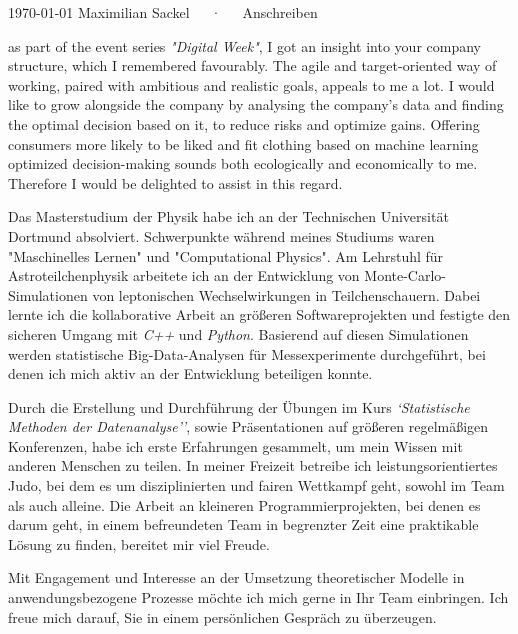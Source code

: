 \documentclass[11pt, a4paper]{Awesome-CV/awesome-cv}
\begin{document}
\makecvheader[R]

\makecvfooter
{\today}
{Maximilian Sackel~~~·~~~Anschreiben}
{}

\makelettertitle

\begin{cvletter}
    as part of the event series \textit{"Digital Week"}, I got an insight into your company structure,
    which I remembered favourably.
    The agile and target-oriented way of working,
    paired with ambitious and realistic goals,
    appeals to me a lot.
    I would like to grow alongside the company by analysing the company's data
    and finding the optimal decision based on it, to reduce risks and optimize gains.
    Offering consumers more likely to be liked and fit clothing based on machine learning optimized decision-making sounds both ecologically and economically to me.
    Therefore I would be delighted to assist in this regard.

    Das Masterstudium der Physik habe ich an der Technischen Universität Dortmund absolviert.  Schwerpunkte während meines Studiums waren "Maschinelles Lernen" und "Computational Physics".
    Am Lehrstuhl für Astroteilchenphysik arbeitete ich an der Entwicklung von Monte-Carlo-Simulationen von leptonischen Wechselwirkungen in Teilchenschauern.
    Dabei lernte ich die kollaborative Arbeit an größeren Softwareprojekten und festigte den sicheren Umgang mit \textit{C++} und \textit{Python}.
    Basierend auf diesen Simulationen werden statistische Big-Data-Analysen für Messexperimente durchgeführt, bei denen ich mich aktiv an der Entwicklung beteiligen konnte.

    Durch die Erstellung und Durchführung der Übungen im Kurs \textit{`Statistische Methoden der Datenanalyse''}, sowie Präsentationen auf größeren regelmäßigen Konferenzen, habe ich erste Erfahrungen gesammelt, um mein Wissen mit anderen Menschen zu teilen.
    In meiner Freizeit betreibe ich leistungsorientiertes Judo, bei dem es um disziplinierten und fairen Wettkampf geht, sowohl im Team als auch alleine.
    Die Arbeit an kleineren Programmierprojekten, bei denen es darum geht, in einem befreundeten Team in begrenzter Zeit eine praktikable Lösung zu finden, bereitet mir viel Freude.

    Mit Engagement und Interesse an der Umsetzung theoretischer Modelle in anwendungsbezogene Prozesse möchte ich mich gerne in Ihr Team einbringen.
    Ich freue mich darauf, Sie in einem persönlichen Gespräch zu überzeugen.

\end{cvletter}


\makeletterclosing
\end{document}

